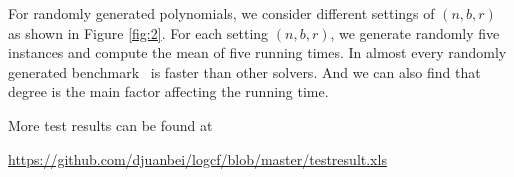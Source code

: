 %
%
%
%
%
%
%
%
%
%
%



For randomly generated polynomials, we consider different settings of
$(n,b,r)$ as shown in Figure \ref{fig:2}. For each setting $(n,b,r)$, we generate randomly five instances and  compute the mean of five running times. In almost every randomly generated benchmark \froot\  is  faster than other  solvers. And we can also  find that
degree is the main factor affecting the  running time.

More test results can be found at
	
	 \url{https://github.com/djuanbei/logcf/blob/master/testresult.xls}

